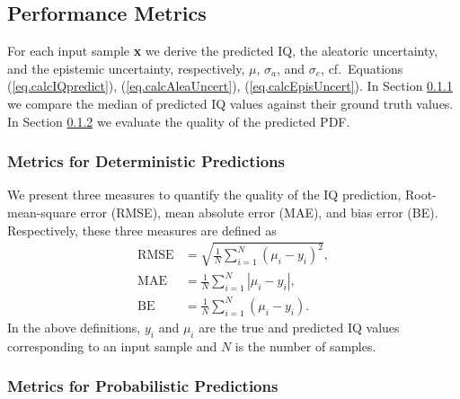 
\subsection{Performance Metrics}\label{sec:DL_metrics}
For each input sample \textbf{x} we derive the predicted IQ, the aleatoric uncertainty, and the epistemic uncertainty, respectively, $\mu$, $\sigma_a$, and $\sigma_e$, cf.~Equations (\ref{eq.calcIQpredict}), (\ref{eq.calcAleaUncert}), (\ref{eq.calcEpisUncert}). In Section \ref{sec:metrics_det} we compare the median of predicted IQ values against their ground truth values. In Section \ref{sec:metrics_prob} we evaluate the quality of the predicted PDF.

\subsubsection{Metrics for Deterministic Predictions}\label{sec:metrics_det}
We present three measures to quantify the quality of the IQ prediction, Root-mean-square error (RMSE), mean absolute error (MAE), and bias error (BE).  Respectively, these three measures are defined as
\begin{align*}
        \mathrm{RMSE} & = \sqrt{\frac{1}{N} \sum_{i=1}^{N}\left(\mu_i-y_i\right)^{2}},\\  \mathrm{MAE} & = \frac{1}{N} \sum_{i=1}^{N}\left|\mu_i-y_i\right|,\\
        \mathrm{BE} & = \frac{1}{N} \sum_{i=1}^{N} \left(\mu_i-y_i\right).
    \end{align*}
In the above definitions, $y_i$ and $\mu_i$ are the true and predicted IQ values corresponding to an input sample and $N$ is the number of samples.

\subsubsection{Metrics for Probabilistic Predictions}\label{sec:metrics_prob}


